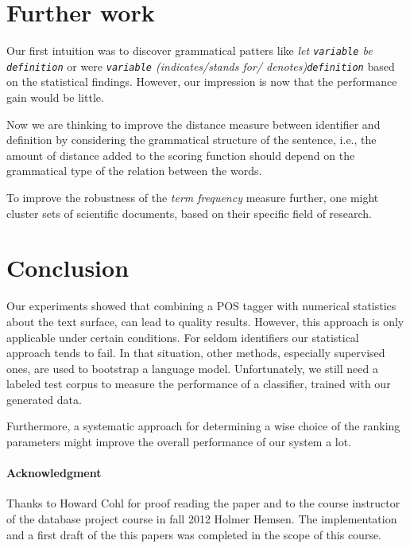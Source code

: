 \documentclass[runningheads]{llncs}
\begin{document}
\section{Further work}
Our first intuition was to discover grammatical patters 
like \emph{let \texttt{variable} be \texttt{definition}} or 
were \emph{\texttt{variable} (indicates/stands for/ denotes)\texttt{definition}} based on the statistical findings.
However, our impression is now that the performance gain would be little.

Now we are thinking to improve the distance measure between identifier and definition by 
considering the grammatical structure of the sentence,
i.e., the amount of distance added to the scoring function should depend on the grammatical 
type of the relation between the words.

To improve the robustness of the \emph{term frequency} measure further, one
might cluster sets of scientific documents, based on their specific field of
research.


\section{Conclusion}
Our experiments showed that combining a POS tagger with numerical statistics
about the text surface, can lead to quality results.
However, this approach is
only applicable under certain conditions. 
For seldom identifiers our statistical approach tends to fail.
In that situation, other methods, especially supervised ones, are used to
bootstrap a language model.
Unfortunately, we still need a labeled test
corpus to measure the performance of a classifier, trained with our generated
data.

Furthermore, a systematic approach for determining a wise choice of the ranking parameters might improve the overall performance of our system a lot.
\paragraph*{Acknowledgment}
Thanks to Howard Cohl for proof reading the paper and to the course instructor of the database project course in fall 2012 Holmer Hemsen. The implementation and a first draft of the this papers was completed in the scope of this course.


\begingroup
\let\clearpage\relax

\endgroup
\end{document}
